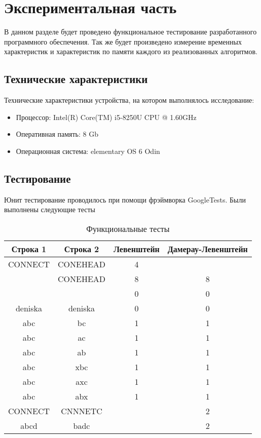 \chapter{Экспериментальная часть}

    В данном разделе будет проведено функциональное тестирование разработанного программного обеспечения. Так же будет произведено измерение временных характеристик и характеристик по памяти каждого из реализованных алгоритмов.

    \section{Технические характеристики}
    
        Технические характеристики устройства, на котором выполнялось исследование:
        
        \begin{itemize}
            \item Процессор: Intel(R) Core(TM) i5-8250U CPU @ 1.60GHz \cite{intel}
            \item Оперативная память: 8 Gb
            \item Операционная система: elementary OS 6 Odin \cite{elemos}
        \end{itemize}
    
    \section{Тестирование}
    
        Юнит тестирование проводилось при помощи фрэймворка GoogleTests. Были выполнены следующие тесты
        
        \begin{table}[]
            \centering
            \caption{Функциональные тесты}
            \begin{tabular}{|c|c|c|c|}
\hline \textbf{Строка 1} & \textbf{Строка 2} & \textbf{Левенштейн} & \textbf{Дамерау-Левенштейн}  \\
\hline CONNECT & CONEHEAD & 4 &  \\
\hline & CONEHEAD & 8 & 8 \\
\hline &  & 0 & 0 \\
\hline deniska & deniska & 0 & 0 \\
\hline abc & bc & 1 & 1 \\
\hline abc & ac & 1 & 1 \\
\hline abc & ab & 1 & 1 \\
\hline abc & xbc & 1 & 1 \\
\hline abc & axc & 1 & 1 \\
\hline abc & abx & 1 & 1 \\
\hline CONNECT & CNNNETC &  & 2 \\
\hline abcd & badc &  & 2 \\
\hline
            \end{tabular}
            \label{tab:my_label}
        \end{table}
        
